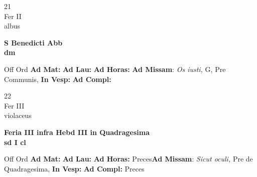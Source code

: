 \documentclass[10pt, openany]{book}
\begin{document}
        \begin{center}
            \begin{minipage}{3.5in}
                \vspace{2em}
                \begin{minipage}{0.5in}
                    {\Huge 21} \\
                    {\normalsize Fer II} \\
                    {\normalsize albus}
                \end{minipage}
                \begin{minipage}{3.0in}
                    \textbf{ \large S Benedicti Abb \\
                    \textnormal{\normalsize dm}} \\ 
                \end{minipage}
                \begin{justify}Off Ord
                    \textbf{Ad Mat: }
                    \textbf{Ad Lau: }
                    \textbf{Ad Horas: }\textbf{Ad Missam}: \textit{Os iusti,} G, Pre Communis,  
                    \textbf{In Vesp: }
                    \textbf{Ad Compl: }
                \end{justify}
            \end{minipage}
        \end{center}
    
        \begin{center}
            \begin{minipage}{3.5in}
                \vspace{2em}
                \begin{minipage}{0.5in}
                    {\Huge 22} \\
                    {\normalsize Fer III} \\
                    {\normalsize violaceus}
                \end{minipage}
                \begin{minipage}{3.0in}
                    \textbf{ \large Feria III infra Hebd III in Quadragesima \\
                    \textnormal{\normalsize sd I cl}} \\ 
                \end{minipage}
                \begin{justify}Off Ord
                    \textbf{Ad Mat: }
                    \textbf{Ad Lau: }
                    \textbf{Ad Horas: }Preces\textbf{Ad Missam}: \textit{Sicut oculi,} Pre de Quadragesima,  
                    \textbf{In Vesp: }
                    \textbf{Ad Compl: }Preces
                \end{justify}
            \end{minipage}
        \end{center}
    
\end{document}
